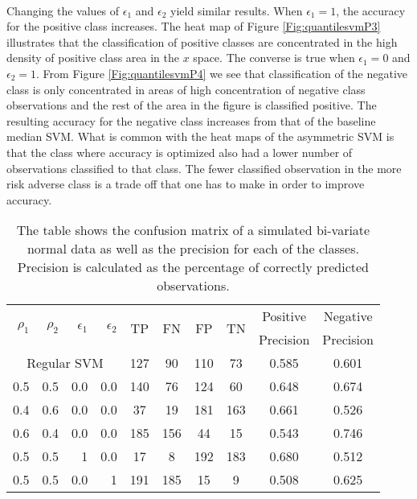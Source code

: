 \documentclass[twoside,11pt]{article}
\begin{document}
\\Changing the values of $\epsilon_1$ and $\epsilon_2$ yield similar results. When $\epsilon_1=1$, the accuracy for the positive class increases. The heat map of Figure \ref{Fig:quantilesvmP3} illustrates that the classification of positive classes are concentrated in the high density of positive class area in the $x$ space. The converse is true when $\epsilon_1=0$ and $\epsilon_2=1$. From Figure \ref{Fig:quantilesvmP4} we see that classification of the negative class is only concentrated in areas of high concentration of negative class observations and the rest of the area in the figure is classified positive. The resulting accuracy for the negative class increases from that of the baseline median SVM. What is common with the heat maps of the asymmetric SVM is that the class where accuracy is optimized also had a lower number of observations classified to that class. The fewer classified observation in the more risk adverse class is a trade off that one has to make in order to improve accuracy.


\begin{table}[htp]\label{simulatedsvmtable}

\begin{tabular}{rrrr|cccccc}

\hline
 \multirow{2}{*}{$\rho_1$} & \multirow{2}{*}{$\rho_2$} & \multirow{2}{*}{$\epsilon_1$} & \multirow{2}{*}{$\epsilon_2$} & \multirow{2}{*}{TP}    & \multirow{2}{*}{FN}    & \multirow{2}{*}{FP}    & \multirow{2}{*}{TN} & Positive & Negative \\
    &&&&&&&&  Precision &  Precision \\

\hline
\hline
\multicolumn{4}{c|}{Regular SVM} &        127 &         90 &        110 &         73 &      0.585 &      0.601 \\

0.5   & 0.5   & 0.0   & 0.0 &        140 &         76 &        124 &         60 &      0.648 &      0.674 \\

0.4   & 0.6   & 0.0   & 0.0 &         37 &         19 &        181 &        163 &      0.661 &      0.526 \\

0.6   & 0.4   & 0.0   & 0.0 &        185 &        156 &         44 &         15 &      0.543 &      0.746 \\

0.5   & 0.5   & 1   & 0.0 &         17 &          8 &        192 &        183 &      0.680 &      0.512 \\

0.5   & 0.5   & 0.0   & 1 &        191 &        185 &         15 &          9 &      0.508 &      0.625 \\
\hline
\hline
\end{tabular}
\caption{The table shows the confusion matrix of a simulated bi-variate normal data as well as the precision for each of the classes. Precision is calculated as the percentage of correctly predicted observations.}
\end{table}
\end{document}
